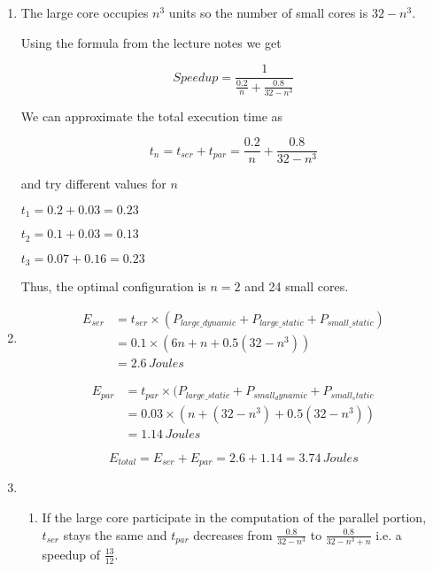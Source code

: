 \documentclass[a4paper]{article}
\begin{document}
\begin{enumerate}[label=\alph*)]
    \item The large core occupies $n^3$ units so the number of small cores is
        $32 - n^3$.

        Using the formula from the lecture notes we get

        \[ Speedup = \frac{1}{\frac{0.2}{n} + \frac{0.8}{32-n^3}} \]

        We can approximate the total execution time as

        \[ t_n = t_{ser} + t_{par} = \frac{0.2}{n} + \frac{0.8}{32-n^3} \]

        and try different values for $n$

        $t_1 = 0.2 + 0.03 = 0.23$

        $t_2 = 0.1 + 0.03 = 0.13$

        $t_3 = 0.07 + 0.16 = 0.23$

        Thus, the optimal configuration is $n=2$ and 24 small cores.

    \item
        \begin{equation*}
            \begin{split}
                E_{ser} &= t_{ser} \times (P_{large\_dynamic} + P_{large\_static}
                + P_{small\_static}) \\
                &= 0.1 \times (6n + n + 0.5(32 - n^3)) \\
                &= 2.6 \, Joules
            \end{split}
        \end{equation*}

        \begin{equation*}
            \begin{split}
                E_{par} &= t_{par} \times (P_{large\_static} + P_{small_dynamic}
                + P_{small_static} \\
                &= 0.03 \times (n + (32 - n^3) + 0.5(32 - n^3)) \\
                &= 1.14 \, Joules
            \end{split}
        \end{equation*}

        \[E_{total} = E_{ser} + E_{par} = 2.6 + 1.14 = 3.74 \, Joules\]

    \item
        \begin{enumerate}[label=\roman*)]
            \item If the large core participate in the computation of the
                parallel portion, $t_{ser}$ stays the same and $t_{par}$
                decreases from $\frac{0.8}{32-n^3}$ to $\frac{0.8}{32-n^3 + n}$
                i.e. a speedup  of $\frac{13}{12}$.


\end{enumerate}
\end{enumerate}
\end{document}
